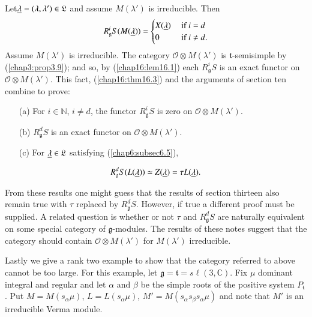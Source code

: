 \begin{theorem}\label{chap16:thm16.3}
Let\pageoriginale $\underline{\lambda} = (\lambda, \lambda') \in \mathfrak{L}$
and assume $M(\lambda')$ is irreducible. Then  
$$
R^i_\mathfrak{g} S (M(\underline{\lambda})) = 
\begin{cases}
X(\underline{\lambda}) & \text{ if } i = d \\
0 & \text{ if } i \neq d. 
\end{cases}
$$
Assume $M(\lambda')$ is irreducible. The category $\mathscr{O} \otimes
M(\lambda')$ is $\mathfrak{t}$-semisimple by (\ref{chap3:prop3.9});
and so, by (\ref{chap16:lem16.1}) 
each $R^i_\mathfrak{g} S$ is an exact functor on $\mathscr{O} \otimes
M(\lambda')$. This fact, (\ref{chap16:thm16.3}) and the arguments of section ten
combine to prove:
\end{theorem}


\begin{theorem}\label{chap16:thm16.4}
\begin{itemize}
\item[{\rm (a)}] For $i \in \mathbb{N}$, $i \neq d$, the functor
  $R^i_\mathfrak{g} S$ is zero on $\mathscr{O} \otimes M(\lambda')$. 

\item[{\rm (b)}] $R^d_\mathfrak{g} S$ is an exact functor on
  $\mathscr{O} \otimes M(\lambda')$. 

\item[{\rm (c)}] For $\underline{\lambda} \in \mathfrak{L}$ satisfying (\ref{chap6:subsec6.5}), 
\end{itemize}
$$
R^d_\mathfrak{g} S (L(\underline{\lambda})) \simeq Z(\underline{\lambda}) = \tau
L(\underline{\lambda}). 
$$
\end{theorem}


From these results one might guess that the results of section
thirteen also remain true with $\tau$ replaced by
$R^d_\mathfrak{g}S$. However, if true a different proof must be
supplied. A related question is whether or not $\tau$ and
$R^d_\mathfrak{g}S$ are naturally equivalent on some special category
of $\mathfrak{g}$-modules. The results of these notes suggest that the
category should contain $\mathscr{O} \otimes M(\lambda')$ for
$M(\lambda')$ irreducible. 

Lastly we give a rank two example to show that the category referred
to above cannot be too large. For this example, let $\mathfrak{g}=
\mathfrak{t} = s\ell (3, \mathbb{C})$. Fix $\mu$ dominant integral and
regular and let $\alpha$ and $\beta$ be the simple roots of the
positive system $P_\mathfrak{t}$. Put $M= M(s_\alpha \mu)$, $L =
L(s_\alpha \mu)$, $M'  = M(s_\alpha s_\beta s_\alpha \mu)$ and note
that $M'$ is an irreducible Verma module. 

